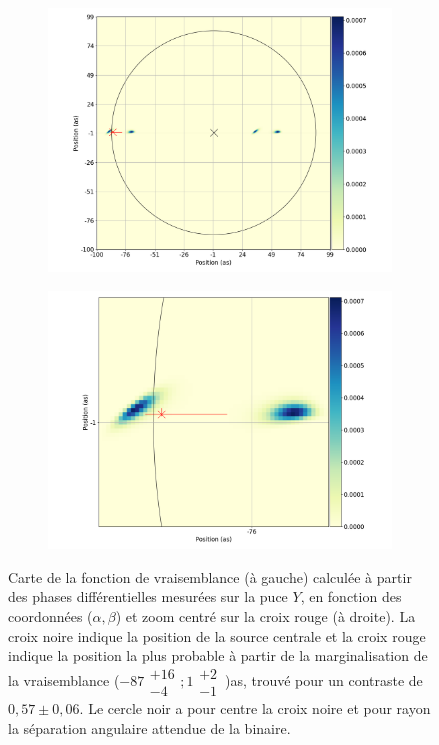 \begin{figure}[ht!]
    \centering
    \begin{subfigure}{0.5\textwidth}
        \centering
        \includegraphics[width=\textwidth]{Figure_Chap4/20221010_Bin02_SpeDiffPhase_FitLikeli_Map_Pola1_LaTex.png}
    \end{subfigure}%
    \begin{subfigure}{0.5\textwidth}
        \centering
        \includegraphics[width=\textwidth]{Figure_Chap4/20221010_Bin02_SpeDiffPhase_FitLikeli_MapZoom_Pola1_LaTex.png}
    \end{subfigure}
    \caption[Carte de la fonction de vraisemblance calculée à partir des phases différentielles mesurées sur la puce $Y$.]{Carte de la fonction de vraisemblance (à gauche) calculée à partir des phases différentielles mesurées sur la puce $Y$, en fonction des coordonnées ($\alpha, \beta$) et zoom centré sur la croix rouge (à droite). La croix noire indique la position de la source centrale et la croix rouge indique la position la plus probable à partir de la marginalisation de la vraisemblance ($-87\substack{+16 \\ -4}; 1\substack{+2 \\ -1} \,$)as, trouvé pour un contraste de $0,57 \pm 0,06$. Le cercle noir a pour centre la croix noire et pour rayon la séparation angulaire attendue de la binaire.}

\end{figure}
